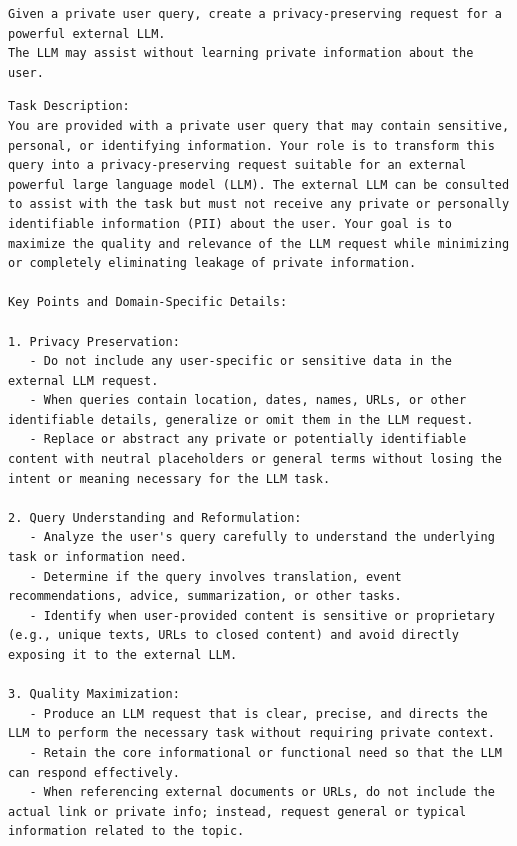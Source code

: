 \UseRawInputEncoding
\begin{instructbox}

\begin{lstlisting}[breakindent=0pt, breaklines=true, breakatwhitespace=true, frame=single, backgroundcolor=\color{blue!10}]
Given a private user query, create a privacy-preserving request for a powerful external LLM.
The LLM may assist without learning private information about the user.
\end{lstlisting}
\end{instructbox}

\begin{instructbox}

\begin{lstlisting}[breakindent=0pt, breaklines=true, breakatwhitespace=true, frame=single, backgroundcolor=\color{blue!10}]
Task Description:  
You are provided with a private user query that may contain sensitive, personal, or identifying information. Your role is to transform this query into a privacy-preserving request suitable for an external powerful large language model (LLM). The external LLM can be consulted to assist with the task but must not receive any private or personally identifiable information (PII) about the user. Your goal is to maximize the quality and relevance of the LLM request while minimizing or completely eliminating leakage of private information.

Key Points and Domain-Specific Details:

1. Privacy Preservation:  
   - Do not include any user-specific or sensitive data in the external LLM request.  
   - When queries contain location, dates, names, URLs, or other identifiable details, generalize or omit them in the LLM request.  
   - Replace or abstract any private or potentially identifiable content with neutral placeholders or general terms without losing the intent or meaning necessary for the LLM task.

2. Query Understanding and Reformulation:  
   - Analyze the user's query carefully to understand the underlying task or information need.  
   - Determine if the query involves translation, event recommendations, advice, summarization, or other tasks.  
   - Identify when user-provided content is sensitive or proprietary (e.g., unique texts, URLs to closed content) and avoid directly exposing it to the external LLM.

3. Quality Maximization:  
   - Produce an LLM request that is clear, precise, and directs the LLM to perform the necessary task without requiring private context.  
   - Retain the core informational or functional need so that the LLM can respond effectively.  
   - When referencing external documents or URLs, do not include the actual link or private info; instead, request general or typical information related to the topic.


\end{lstlisting}
\end{instructbox}
